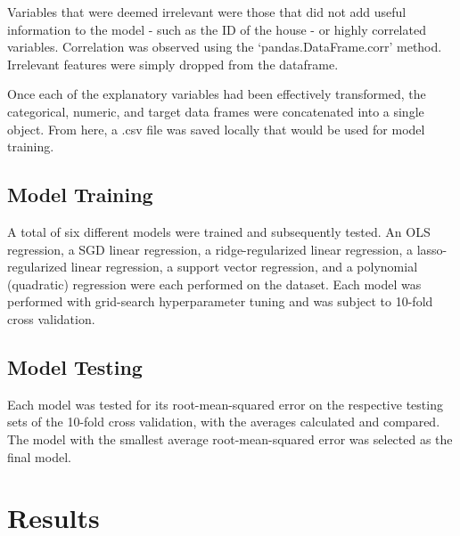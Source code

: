 \documentclass[12pt]{article}
\begin{document}
\par Variables that were deemed irrelevant were those that did not add useful information to the model - such as the ID of the house - or highly correlated variables. Correlation was observed using the ‘pandas.DataFrame.corr’ method. Irrelevant features were simply dropped from the dataframe.
\par Once each of the explanatory variables had been effectively transformed, the categorical, numeric, and target data frames were concatenated into a single object. From here, a .csv file was saved locally that would be used for model training.

\subsection{Model Training}
\par \qquad A total of six different models were trained and subsequently tested. An OLS regression, a SGD linear regression, a ridge-regularized linear regression, a lasso-regularized linear regression, a support vector regression, and a polynomial (quadratic) regression were each performed on the dataset. Each model was performed with grid-search hyperparameter tuning and was subject to 10-fold cross validation.

\subsection{Model Testing}
\par \qquad Each model was tested for its root-mean-squared error on the respective testing sets of the 10-fold cross validation, with the averages calculated and compared. The model with the smallest average root-mean-squared error was selected as the final model.

\section*{Results}
\end{document}
